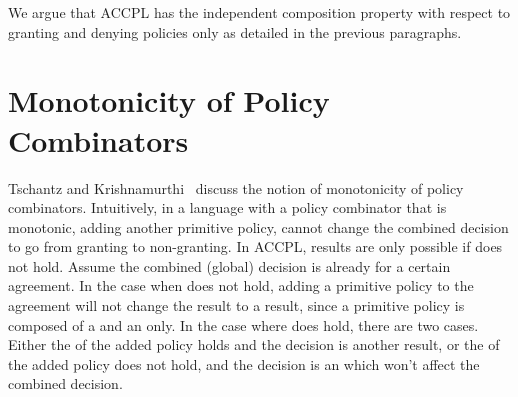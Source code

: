 We argue that \ac{ACCPL} has the independent composition property with respect to granting and denying policies only as detailed in the previous paragraphs. 

\section{Monotonicity of Policy Combinators}

Tschantz and Krishnamurthi~\cite{Tschantz} discuss the notion of monotonicity of policy combinators. Intuitively, in a language with a policy combinator that is monotonic, adding another primitive policy, cannot change the combined decision to go from granting to non-granting. In \ac{ACCPL},  results are only possible if  does not hold. Assume the combined (global) decision is already  for a certain agreement. In the case when  does not hold, adding a primitive policy to the agreement will not change the  result to a  result, since a primitive policy is composed of a  and an  only. In the case where  does hold, there are two cases. Either the  of the added policy holds and the decision is another  result, or the  of the added policy does not hold, and the decision is an  which won't affect the combined decision.






